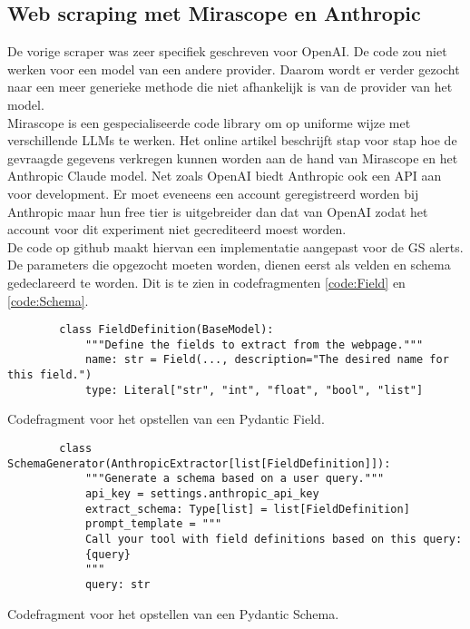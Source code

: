 \subsection{Web scraping met Mirascope en Anthropic}
De vorige scraper was zeer specifiek geschreven voor OpenAI. De code zou niet werken voor een model van een andere provider. Daarom wordt er verder gezocht naar een meer generieke methode die niet afhankelijk is van de provider van het model.\\
Mirascope \textcite{Mirascope2025} is een gespecialiseerde code library om op uniforme wijze met verschillende LLMs te werken.
Het online artikel \textcite{Anthropic2025} beschrijft stap voor stap hoe de gevraagde gegevens verkregen kunnen worden aan de hand van Mirascope en het Anthropic Claude model. Net zoals OpenAI biedt Anthropic ook een API \autocite{Anthropicmodel2025} aan voor development. Er moet eveneens een account geregistreerd worden bij Anthropic maar hun free tier is uitgebreider dan dat van OpenAI zodat het account voor dit experiment niet gecrediteerd moest worden.\\
De code op github \textcite{Depaepeanthropic2025} maakt hiervan een implementatie aangepast voor de GS alerts.
De parameters die opgezocht moeten worden, dienen eerst als velden en schema gedeclareerd te worden. Dit is te zien in codefragmenten \ref{code:Field} en \ref{code:Schema}.
\begin{listing}
    \begin{verbatim}
        class FieldDefinition(BaseModel):
            """Define the fields to extract from the webpage."""
            name: str = Field(..., description="The desired name for this field.")
            type: Literal["str", "int", "float", "bool", "list"]
    \end{verbatim}
    \caption[Field codefragment]{Codefragment voor het opstellen van een Pydantic Field.}
    \label{code:Field}
\end{listing}
\begin{listing}
    \begin{verbatim}
        class SchemaGenerator(AnthropicExtractor[list[FieldDefinition]]):
            """Generate a schema based on a user query."""
            api_key = settings.anthropic_api_key
            extract_schema: Type[list] = list[FieldDefinition]
            prompt_template = """
            Call your tool with field definitions based on this query:
            {query}
            """
            query: str
    \end{verbatim}
    \caption[Schema codefragment]{Codefragment voor het opstellen van een Pydantic Schema.}
    \label{code:Schema}
\end{listing}
